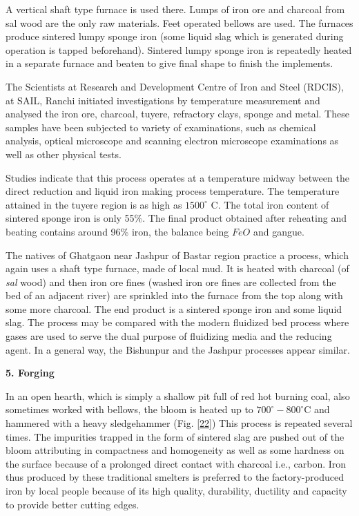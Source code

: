 A vertical shaft type furnace is used there. Lumps of iron ore and charcoal from sal wood are the only raw materials. Feet operated bellows are used. The furnaces produce sintered lumpy sponge iron (some liquid slag which is generated during operation is tapped beforehand). Sintered lumpy sponge iron is repeatedly heated in a separate furnace and beaten to give final shape to finish the implements. 
\medskip

The Scientists at Research and Development Centre of Iron and Steel (RDCIS), at SAIL, Ranchi initiated investigations by temperature measurement and analysed the iron ore, charcoal, tuyere, refractory clays, sponge and metal. These samples have been subjected to variety of examinations, such as chemical analysis, optical microscope and scanning electron microscope examinations as well as other physical tests.

Studies indicate that this process operates at a temperature midway between the direct reduction and liquid iron making process temperature. The temperature attained in the tuyere region is as high as $1500^\circ$ C. The total iron content of sintered sponge iron is only 55\%. The final product obtained after reheating and beating contains around 96\% iron, the balance being $FeO$ and gangue. 

The natives of Ghatgaon near Jashpur of Bastar region practice a process, which again uses a shaft type furnace, made of local mud. It is heated with charcoal (of {\it sal} wood) and then iron ore fines (washed iron ore fines are collected from the bed of an adjacent river) are sprinkled into the furnace from the top along with some more charcoal. The end product is a sintered sponge iron and some liquid slag. The process may be compared with the modern fluidized bed process where gases are used to serve the dual purpose of fluidizing media and the reducing agent. In a general way, the Bishunpur and the Jashpur processes appear similar.

\noindent \textbf{\large 5.  Forging}

In an open hearth, which is simply a shallow pit full of red hot burning coal, also sometimes worked with bellows, the bloom is heated up to $700^\circ-800^\circ$C and hammered with a heavy sledgehammer (Fig. \ref{22}) This process is repeated several times. The impurities trapped in the form of sintered slag are pushed out of the bloom attributing in compactness and homogeneity as well as some hardness on the surface because of a prolonged direct contact with charcoal i.e., carbon. Iron thus produced by these traditional smelters is preferred to the factory-produced iron by local people because of its high quality, durability, ductility and capacity to provide better cutting edges.	

